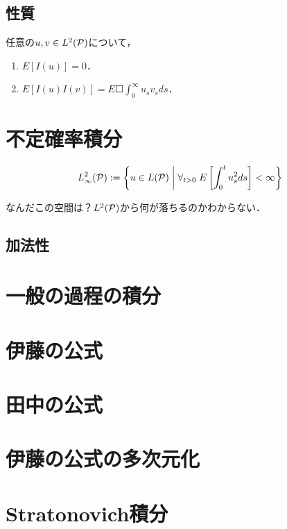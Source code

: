 \documentclass[uplatex,dvipdfmx]{jsreport}
\begin{document}
\subsection{性質}

\begin{proposition}
    任意の$u,v\in L^2(\P)$について，
    \begin{enumerate}
        \item $E[I(u)]=0$．
        \item $E[I(u)I(v)]=E\Square{\int^\infty_0u_sv_sds}$．
    \end{enumerate}
\end{proposition}

\section{不定確率積分}

\begin{notation}
    \[L^2_\infty(\P):=\Brace{u\in L(\P)\;\middle|\;\forall_{t>0}\;E\Square{\int^t_0u_s^2ds}<\infty}\]
\end{notation}

なんだこの空間は？$L^2(\P)$から何が落ちるのかわからない．

\subsection{加法性}

\section{一般の過程の積分}

\section{伊藤の公式}

\section{田中の公式}

\section{伊藤の公式の多次元化}

\section{Stratonovich積分}
\end{document}
